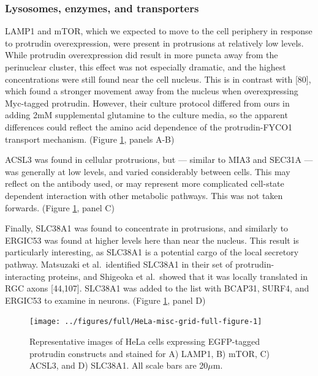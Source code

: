 \documentclass[
  12pt,
  a4paper,
]{book}
\begin{document}
\hypertarget{lysosomes-enzymes-and-transporters}{%
\subsubsection{Lysosomes, enzymes, and transporters}\label{lysosomes-enzymes-and-transporters}}

LAMP1 and mTOR, which we expected to move to the cell periphery in response to protrudin overexpression, were present in protrusions at relatively low levels. While protrudin overexpression did result in more puncta away from the perinuclear cluster, this effect was not especially dramatic, and the highest concentrations were still found near the cell nucleus. This is in contrast with {[}80{]}, which found a stronger movement away from the nucleus when overexpressing Myc-tagged protrudin. However, their culture protocol differed from ours in adding 2mM supplemental glutamine to the culture media, so the apparent differences could reflect the amino acid dependence of the protrudin-FYCO1 transport mechanism. (Figure \ref{fig:HeLa-misc-grid-full-figure}, panels A-B)

ACSL3 was found in cellular protrusions, but --- similar to MIA3 and SEC31A --- was generally at low levels, and varied considerably between cells. This may reflect on the antibody used, or may represent more complicated cell-state dependent interaction with other metabolic pathways. This was not taken forwards. (Figure \ref{fig:HeLa-misc-grid-full-figure}, panel C)

Finally, SLC38A1 was found to concentrate in protrusions, and similarly to ERGIC53 was found at higher levels here than near the nucleus. This result is particularly interesting, as SLC38A1 is a potential cargo of the local secretory pathway. Matsuzaki et al.~identified SLC38A1 in their set of protrudin-interacting proteins, and Shigeoka et al.~showed that it was locally translated in RGC axons {[}44,107{]}. SLC38A1 was added to the list with BCAP31, SURF4, and ERGIC53 to examine in neurons. (Figure \ref{fig:HeLa-misc-grid-full-figure}, panel D)

\begin{figure}
\texttt{[image: ../figures/full/HeLa-misc-grid-full-figure-1]} \caption[Protrudin-expressing HeLa cells stained for LAMP1, mTOR, ACSL3, and SLC38A1]{Representative images of HeLa cells expressing EGFP-tagged protrudin constructs and stained  for A) LAMP1, B) mTOR, C) ACSL3, and D) SLC38A1.  All scale bars are 20$\mu$m.}\label{fig:HeLa-misc-grid-full-figure}
\end{figure}
\end{document}
